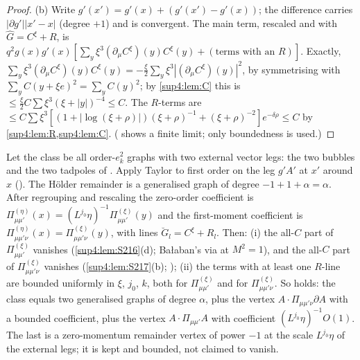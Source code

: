 \begin{proof}
(b) Write $g'(x')=g'(x)+(g'(x')-g'(x))$; the difference carries $|\partial g'||x'-x|$ (degree $+1$) and is convergent. The main term, rescaled and with $\hat G=C^\xi+R$, is $q^2g(x)g'(x)[\sum_y\xi^3(\partial_\mu C^\xi)(y)C^\xi(y)+(\text{terms with an }R)]$. Exactly, $\sum_y\xi^3(\partial_\mu C^\xi)(y)C^\xi(y)=-\frac\xi2\sum_y\xi^3|(\partial_\mu C^\xi)(y)|^2$, by symmetrising with $\sum_yC(y+\xi e)^2=\sum_yC(y)^2$; by \cref{sup4:lem:C} this is $\le\frac\xi2C\sum\xi^3(\xi+|y|)^{-4}\le C$. The $R$-terms are $\le C\sum\xi^3[(1+|\log(\xi+\rho)|)(\xi+\rho)^{-1}+(\xi+\rho)^{-2}]e^{-\delta\rho}\le C$ by \cref{sup4:lem:R,sup4:lem:C}. (\cite[(3.24)]{Ba3} shows a finite limit; only boundedness is used.)
\end{proof}

\begin{lemma}[{vector self-energies with $D=-1$, \cite[(3.25)--(3.30)]{Ba3}}]\label{sup4:lem:S2111}
Let the class be all order-$e_k^2$ graphs with two external vector legs: the two bubbles and the two tadpoles of \cite[(3.25)]{Ba3}. Apply Taylor to first order on the leg $g'A'$ at $x'$ around $x$ (\cite[(3.26)]{Ba3}). The H\"older remainder is a generalised graph of degree $-1+1+\alpha=\alpha$. After regrouping and rescaling the zero-order coefficient is $\Pi^{(\eta)}_{\mu\mu'}(x)=(L^{j_0}\eta)^{-1}\Pi^{(\xi)}_{\mu\mu'}(y)$ and the first-moment coefficient is $\Pi^{(\eta)}_{\mu\mu'\nu}(x)=\Pi^{(\xi)}_{\mu\mu'\nu}(y)$, with lines $\breve G_l=C^\xi+R_l$. Then: \textup{(i)} the all-$C$ part of $\Pi^{(\xi)}_{\mu\mu'}$ vanishes (\cref{sup4:lem:S216}(d); Ba{\l}aban's \cite[(3.29)]{Ba3} via \cite[(2.26)]{Ba3} at $M^2=1$), and the all-$C$ part of $\Pi^{(\xi)}_{\mu\mu'\nu}$ vanishes (\cref{sup4:lem:S217}(b); \cite[(3.27)--(3.28)]{Ba3}); \textup{(ii)} the terms with at least one $R$-line are bounded uniformly in $\xi$, $j_0$, $k$, both for $\Pi^{(\xi)}_{\mu\mu'}$ and for $\Pi^{(\xi)}_{\mu\mu'\nu}$. So \cite[(3.30)]{Ba3} holds: the class equals two generalised graphs of degree $\alpha$, plus the vertex $A\cdot\Pi_{\mu\mu'\nu}\partial A$ with a bounded coefficient, plus the vertex $A\cdot\Pi_{\mu\mu'}A$ with coefficient $(L^{j_0}\eta)^{-1}O(1)$. The last is a zero-momentum remainder vertex of power $-1$ at the scale $L^{j_0}\eta$ of the external legs; it is kept and bounded, not claimed to vanish.
\end{lemma}

